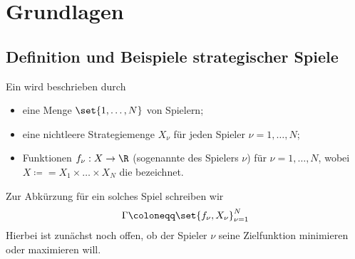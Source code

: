 \section{Grundlagen}
\subsection{Definition und Beispiele strategischer Spiele}
\begin{definition*}
  Ein  wird beschrieben durch
  \begin{itemize}
  \item  eine Menge $\set{1, \dots, N}$ von Spielern;
  \item  eine nichtleere Strategiemenge $X_{\nu}$ für jeden Spieler $\nu = 1, \dots, N$;
  \item Funktionen $f_{\nu}: X \to \R$ (sogenannte  des Spielers $\nu$) für $\nu = 1, \dots, N$, wobei $X \coloneqq= X_{1} \times \dots \times X_{N}$ die  bezeichnet. 
  \end{itemize}
Zur Abkürzung für ein solches Spiel schreiben wir
\begin{align*}
  \Gamma \coloneqq \set{f_{\nu}, X_{\nu}}_{\nu = 1}^{N}
\end{align*}
Hierbei ist zunächst noch offen, ob der Spieler $\nu$ seine Zielfunktion minimieren oder maximieren will.
\end{definition*}
